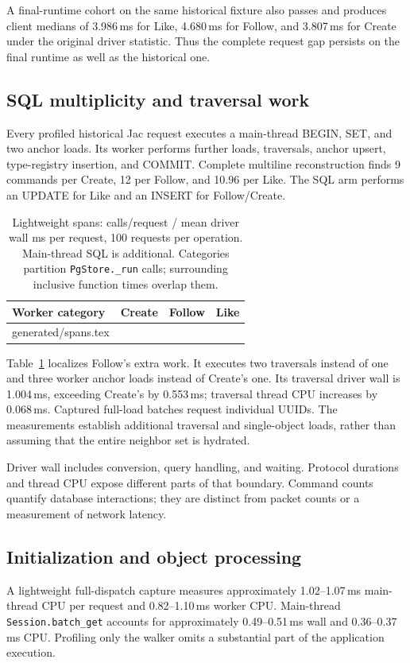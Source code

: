 \documentclass[sigconf,nonacm]{acmart}
\makeatletter
\newcommand{\code}[1]{\texttt{#1}}
\newcommand{\tableinput}[1]{\@@input #1 }
\makeatother
\begin{document}
A final-runtime cohort on the same historical fixture also passes and
produces client medians of 3.986\,ms for Like, 4.680\,ms for Follow, and
3.807\,ms for Create under the original driver statistic. Thus the complete
request gap persists on the final runtime as well as the historical one.

\subsection{SQL multiplicity and traversal work}
Every profiled historical Jac request executes a main-thread BEGIN, SET,
and two anchor loads. Its worker performs further loads, traversals, anchor
upsert, type-registry insertion, and COMMIT. Complete multiline reconstruction
finds 9 commands per Create, 12 per Follow, and 10.96 per Like. The SQL arm
performs an UPDATE for Like and an INSERT for Follow/Create.

\begin{table}[t]
\caption{Lightweight spans: calls/request / mean driver wall ms per request,
100 requests per operation. Main-thread SQL is additional. Categories partition
\code{PgStore.\_run} calls; surrounding inclusive function times overlap them.}
\label{tab:spans}
\centering\small
\setlength{\tabcolsep}{4pt}
\begin{tabular}{lrrr}
\toprule
Worker category & Create & Follow & Like \\
\midrule
\tableinput{generated/spans.tex}
\bottomrule
\end{tabular}
\end{table}

Table~\ref{tab:spans} localizes Follow's extra work. It executes two traversals
instead of one and three worker anchor loads instead of Create's one. Its
traversal driver wall is 1.004\,ms, exceeding Create's by 0.553\,ms; traversal
thread CPU increases by 0.068\,ms. Captured full-load batches request individual
UUIDs. The measurements establish additional traversal and single-object
loads, rather than assuming that the entire neighbor set is hydrated.

Driver wall includes conversion, query handling, and waiting. Protocol
durations and thread CPU expose different parts of that boundary. Command
counts quantify database interactions; they are distinct from packet counts
or a measurement of network latency.

\subsection{Initialization and object processing}
A lightweight full-dispatch capture measures approximately 1.02--1.07\,ms
main-thread CPU per request and 0.82--1.10\,ms worker CPU. Main-thread
\code{Session.batch\_get} accounts for approximately 0.49--0.51\,ms wall and
0.36--0.37\,ms CPU. Profiling only the walker omits a substantial part of the
application execution.
\end{document}
